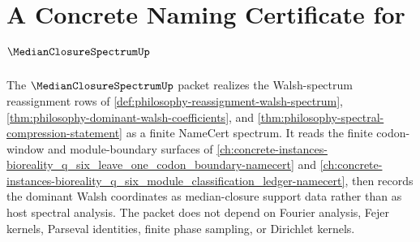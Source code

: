 \chapter{A Concrete Naming Certificate for $\MedianClosureSpectrumUp$}
\label{ch:concrete-instances-median-closure-spectrum-namecert}

The $\MedianClosureSpectrumUp$ packet realizes the Walsh-spectrum reassignment rows of \autoref{def:philosophy-reassignment-walsh-spectrum}, \autoref{thm:philosophy-dominant-walsh-coefficients}, and \autoref{thm:philosophy-spectral-compression-statement} as a finite NameCert spectrum. It reads the finite codon-window and module-boundary surfaces of \autoref{ch:concrete-instances-bioreality_q_six_leave_one_codon_boundary-namecert} and \autoref{ch:concrete-instances-bioreality_q_six_module_classification_ledger-namecert}, then records the dominant Walsh coordinates as median-closure support data rather than as host spectral analysis. The packet does not depend on Fourier analysis, Fejer kernels, Parseval identities, finite phase sampling, or Dirichlet kernels.

